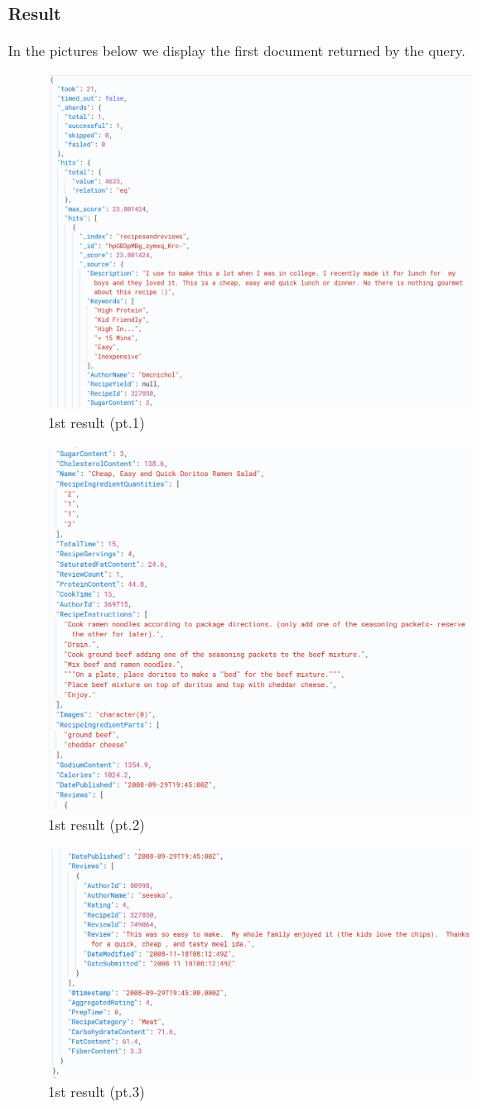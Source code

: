 \begin{enumerate}
    \subsubsection{Result}
    In the pictures below we display the first document returned by the query.
    \begin{figure}[H]
    \centering
    \includegraphics[width=0.7\linewidth]{Report/ReportLatex/Images/ElasticsearchResults/college1.png}
    \caption{1st result (pt.1)}
    \label{fig:enter-label}
    \end{figure}
    \begin{figure}[H]
    \centering
    \includegraphics[width=0.7\linewidth]{Report/ReportLatex/Images/ElasticsearchResults/college2.png}
    \caption{1st result (pt.2)}
    \label{fig:enter-label}
    \end{figure}
    \begin{figure}[H]
    \centering
    \includegraphics[width=1\linewidth]{Report/ReportLatex/Images/ElasticsearchResults/college3.png}
    \caption{1st result (pt.3)}
    \label{fig:enter-label}
    \end{figure}
\end{enumerate}